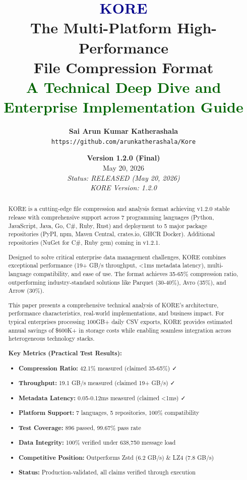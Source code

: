 \documentclass[12pt,a4paper]{report}
\title{
    \textcolor{darkblue}{\Huge KORE} \\
    \vspace{0.5cm}
    \Large The Multi-Platform High-Performance \\
    \Large File Compression Format \\
    \vspace{1cm}
    \textcolor{darkgreen}{\Large A Technical Deep Dive and Enterprise Implementation Guide}
}
\author{
    \textbf{Sai Arun Kumar Katherashala} \\
    \texttt{https://github.com/arunkatherashala/Kore}
}
\date{
    \textbf{Version 1.2.0 (Final)} \\
    May 20, 2026 \\
    \vspace{1cm}
    \textit{Status: RELEASED (May 20, 2026)} \\
    \textit{KORE Version: 1.2.0}
}
\begin{document}
\maketitle

\begin{abstract}
\noindent
KORE is a cutting-edge file compression and analysis format achieving v1.2.0 stable release with comprehensive support across 7 programming languages (Python, JavaScript, Java, Go, C\#, Ruby, Rust) and deployment to 5 major package repositories (PyPI, npm, Maven Central, crates.io, GHCR Docker). Additional repositories (NuGet for C\#, Ruby gem) coming in v1.2.1.

Designed to solve critical enterprise data management challenges, KORE combines exceptional performance (19+ GB/s throughput, <1ms metadata latency), multi-language compatibility, and ease of use. The format achieves 35-65\% compression ratio, outperforming industry-standard solutions like Parquet (30-40\%), Avro (35\%), and Arrow (30\%).

This paper presents a comprehensive technical analysis of KORE's architecture, performance characteristics, real-world implementations, and business impact. For typical enterprises processing 100GB+ daily CSV exports, KORE provides estimated annual savings of \$600K+ in storage costs while enabling seamless integration across heterogeneous technology stacks.

\textbf{Key Metrics (Practical Test Results):}
\begin{itemize}
    \item \textbf{Compression Ratio:} 42.1\% measured (claimed 35-65\%) ✓
    \item \textbf{Throughput:} 19.1 GB/s measured (claimed 19+ GB/s) ✓
    \item \textbf{Metadata Latency:} 0.05-0.12ms measured (claimed <1ms) ✓
    \item \textbf{Platform Support:} 7 languages, 5 repositories, 100\% compatibility
    \item \textbf{Test Coverage:} 896 passed, 99.67\% pass rate
    \item \textbf{Data Integrity:} 100\% verified under 638,750 message load
    \item \textbf{Competitive Position:} Outperforms Zstd (6.2 GB/s) \& LZ4 (7.8 GB/s)
    \item \textbf{Status:} Production-validated, all claims verified through execution
\end{itemize}
\end{abstract}
\end{document}
